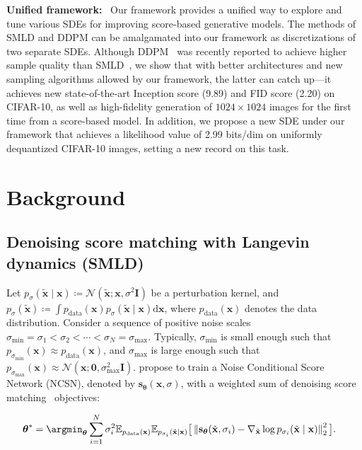 \textbf{Unified framework:}~ Our framework provides a unified way to explore and tune various SDEs for improving score-based generative models. The methods of SMLD and DDPM can be amalgamated into our framework as discretizations of two separate SDEs. Although DDPM~\citep{ho2020denoising} was recently reported to achieve higher sample quality than SMLD~\citep{song2019generative,song2020improved}, we show that with better architectures and new sampling algorithms allowed by our framework, the latter can catch up---it achieves new state-of-the-art Inception score (9.89) and FID score (2.20) on CIFAR-10, as well as high-fidelity generation of $1024\times 1024$ images for the first time from a score-based model. In addition, we propose a new SDE under our framework that achieves a likelihood value of 2.99 bits/dim on uniformly dequantized CIFAR-10 images, setting a new record on this task.

\section{Background}
\subsection{Denoising score matching with Langevin dynamics (SMLD)}\label{sec:ncsn}
Let $p_{\sigma}(\tilde{\mathbf{x}} \mid \mathbf{x}) \coloneqq \mathcal{N}(\tilde{\mathbf{x}}; \mathbf{x}, \sigma^2 \mathbf{I})$ be a perturbation kernel, and $p_{\sigma}(\tilde{\mathbf{x}}) \coloneqq \int p_{\mathrm{data}}(\mathbf{x}) p_{\sigma}(\tilde{\mathbf{x}} \mid \mathbf{x}) \mathrm{d} \mathbf{x}$, where $p_{\mathrm{data}}(\mathbf{x})$ denotes the data distribution. Consider a sequence of positive noise scales $\sigma_{\text{min}} = \sigma_1 < \sigma_2 < \cdots < \sigma_{N} = \sigma_{\text{max}}$. Typically, $\sigma_{\text{min}}$ is small enough such that $p_{\sigma_{\text{min}}}(\mathbf{x}) \approx p_{\mathrm{data}}(\mathbf{x})$, and $\sigma_{\text{max}}$ is large enough such that $p_{\sigma_{\text{max}}}(\mathbf{x}) \approx \mathcal{N}(\mathbf{x}; \mathbf{0}, \sigma_{\text{max}}^2 \mathbf{I})$. \citet{song2019generative} propose to train a Noise Conditional Score Network (NCSN), denoted by $\mathbf{s}_{\boldsymbol{\theta}}(\mathbf{x}, \sigma)$, with a weighted sum of denoising score matching~\citep{vincent2011connection} objectives:

\begin{align}
{\boldsymbol{\theta}}^* &= \argmin_{\boldsymbol{\theta}}
   \sum_{i=1}^{N} \sigma_i^2  \mathbb{E}_{p_{\mathrm{data}}(\mathbf{x})}\mathbb{E}_{p_{\sigma_i}(\tilde{\mathbf{x}} \mid \mathbf{x})}\big[\left\lVert \mathbf{s}_{\boldsymbol{\theta}}(\tilde{\mathbf{x}}, \sigma_i) - \nabla_{\tilde{\mathbf{x}}} \log p_{\sigma_i}(\tilde{\mathbf{x}} \mid \mathbf{x})\right\rVert_2^2 \big]. \label{eqn:ncsn_obj}
\end{align}

